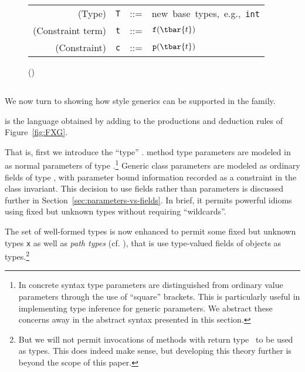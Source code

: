 \begin{figure*}
\centering
\begin{tabular}{r@{\quad}rcl}
  (Type)& {\tt T} &{::=}& \mbox{new base types, e.g., {\tt int}} \\
  (Constraint term) & {\tt t} &{::=}& ${\tt f}(\tbar{t})$ \\
  (Constraint) & {\tt c} &{::=}& ${\tt p}(\tbar{t})$ \\  
\end{tabular}

	{\Gamma{}()~\constraint}
\caption{\FXD}
\end{figure*}

\subsection{\FXG}
We now turn to showing how \FGJ{} style generics can be supported in the \FX{} family.

\FXG{} is the language obtained by adding to \FXZ{} the productions and deduction rules of Figure~\ref{fig:FXG}.

That is, first we introduce the ``type'' \type. \FGJ{} method type
parameters are modeled in \FXG{} as normal parameters of type
\type.\footnote{In concrete \Xten{} syntax type parameters are
distinguished from ordinary value parameters through the use of
``square'' brackets. This is particularly useful in implementing type
inference for generic parameters. We abstract these concerns away in
the abstract syntax presented in this section.}  Generic class
parameters are modeled as ordinary fields of type \type, with
parameter bound information recorded as a constraint in the class
invariant. This decision to use fields rather than parameters is
discussed further in Section~\ref{sec:parameters-vs-fields}. In brief,
it permits powerful idioms using fixed but unknown types without
requiring ``wildcards''.

The set of well-formed types is now enhanced to permit some fixed but unknown
types {\tt x} as well as \emph{path types} (cf. \cite{scala}), that is use type-valued fields of objects as types.\footnote{But we will not permit invocations of methods with return type \type\ to be 
used as types. This does indeed make sense, but developing
this theory further is beyond the scope of this paper.}

